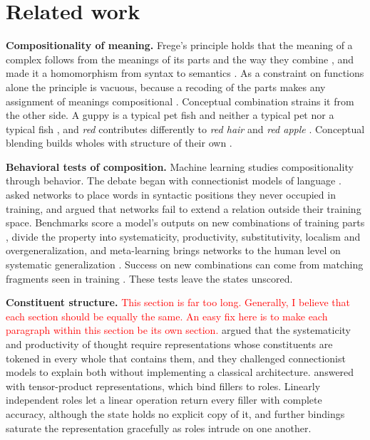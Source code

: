 \documentclass[10pt]{article}
\newcommand{\note}[1]{\textcolor{red}{#1}}
\theoremstyle{plain}
\theoremstyle{remark}
\begin{document}
\section{Related work}
\label{sec:related}

\textbf{Compositionality of meaning.} Frege's principle holds that the meaning of a complex follows from the meanings of its parts and the way they combine \citep{frege1923}, and \citet{montague1970} made it a homomorphism from syntax to semantics \citep[see][]{janssen1997}. As a constraint on functions alone the principle is vacuous, because a recoding of the parts makes any assignment of meanings compositional \citep{zadrozny1994}. Conceptual combination strains it from the other side. A guppy is a typical pet fish and neither a typical pet nor a typical fish \citep{osherson1981}, and \emph{red} contributes differently to \emph{red hair} and \emph{red apple} \citep{kamp1995}. Conceptual blending builds wholes with structure of their own \citep{fauconnier2002}.

\textbf{Behavioral tests of composition.} Machine learning studies compositionality through behavior. The debate began with connectionist models of language \citep{rumelhart1986,pinker1988,elman1990}. \citet{hadley1994} asked networks to place words in syntactic positions they never occupied in training, and \citet{marcus1998} argued that networks fail to extend a relation outside their training space. Benchmarks score a model's outputs on new combinations of training parts \citep{lake2018,keysers2020}, \citet{hupkes2020} divide the property into systematicity, productivity, substitutivity, localism and overgeneralization, and meta-learning brings networks to the human level on systematic generalization \citep{lake2023}. Success on new combinations can come from matching fragments seen in training \citep{dziri2023}. These tests leave the states unscored.

\textbf{Constituent structure.} \note{This section is far too long. Generally, I believe that each section should be equally the same. An easy fix here is to make each paragraph within this section be its own section.} \citet{fodor1988} argued that the systematicity and productivity of thought require representations whose constituents are tokened in every whole that contains them, and they challenged connectionist models to explain both without implementing a classical architecture. \citet{smolensky1990} answered with tensor-product representations, which bind fillers to roles. Linearly independent roles let a linear operation return every filler with complete accuracy, although the state holds no explicit copy of it, and further bindings saturate the representation gracefully as roles intrude on one another.
\end{document}
